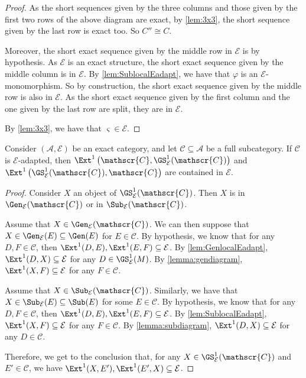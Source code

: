 \begin{proof}
As the short sequences given by the three columns and those given by the first two rows of the above diagram are exact, by \cref{lem:3x3}, the short sequence given by the last row is exact too. So $C'' \cong C$. 

Moreover, the short exact sequence given by the middle row in $\mathcal{E}$ is by hypothesis. As $\mathcal{E}$ is an exact structure, the short exact sequence given by the middle column is in $\mathcal{E}$. By \cref{lem:SublocalEadapt}, we have that $\varphi$ is an $\mathcal{E}$-monomorphism. So by construction, the short exact sequence given by the middle row is also in $\mathcal{E}$. As the short exact sequence given by the first column and the one given by the last row are split, they are in $\mathcal{E}$.

By \cref{lem:3x3}, we have that $\varsigma \in {\mathcal{E}}$. 
\end{proof}

\begin{prop}
\label{prop:Estableinduction}
Consider $(\mathscr{A}, \mathcal{E})$ be an exact category, and let $\mathscr{C} \subseteq \mathscr{A}$ be a full subcategory. If $\mathscr{C}$ is $ {\mathcal{E}}$-adapted, then $\Ext^1\left(\mathscr{C}, \GS^1_{\mathcal{E}}(\mathscr{C})\right)$ and $\Ext^1 \left(\GS^1_{\mathcal{E}}(\mathscr{C}), \mathscr{C} \right)$ are contained in ${\mathcal{E}}$.
\end{prop}

\begin{proof}
Consider $X$ an object of $\GS^1_{\mathcal{E}}(\mathscr{C})$. Then $X$ is in $\Gen_{\mathcal{E}}(\mathscr{C})$ or in $\Sub_{\mathcal{E}}(\mathscr{C})$.

Assume that $X \in \Gen_{\mathcal{E}}(\mathscr{C})$. We can then suppose that $X \in \Gen_{\mathcal{E}}(E) \subseteq \Gen(E)$ for $E \in \mathscr{C}$. By hypothesis, we know that for any $D,F\in \mathscr{C}$, then $\Ext^1(D,E),\Ext^1(E,F) \subseteq \mathcal{E}$. By \cref{lem:GenlocalEadapt}, $\Ext^1(D,X) \subseteq \mathcal{E}$ for any $D \in \GS^{1}_{\mathcal{E}}(M)$. By \cref{lemma:gendiagram}, $\Ext^1(X,F) \subseteq \mathcal{E}$ for any $F \in \mathscr{C}$.

Assume that $X \in \Sub_{\mathcal{E}}(\mathscr{C})$. Similarly, we have that $X \in \Sub_{\mathcal{E}}(E) \subseteq \Sub(E)$ for some $E \in \mathscr{C}$. By hypothesis, we know that for any $D,F \in \mathscr{C}$, then $\Ext^1(D,E),\Ext^1(E,F) \subseteq \mathcal{E}$. By \cref{lem:SublocalEadapt}, $\Ext^1(X,F) \subseteq \mathcal{E}$ for any $F \in \mathscr{C}$. By \cref{lemma:subdiagram}, $\Ext^1(D,X) \subseteq \mathcal{E}$ for any $D \in \mathscr{C}$.

Therefore, we get to the conclusion that, for any $X\in \GS^1_{\mathcal{E}}(\mathscr{C})$ and $E' \in \mathscr{C}$, we have $\Ext^1(X,E'),\Ext^1(E',X)\subseteq \mathcal{E}$.
\end{proof}

